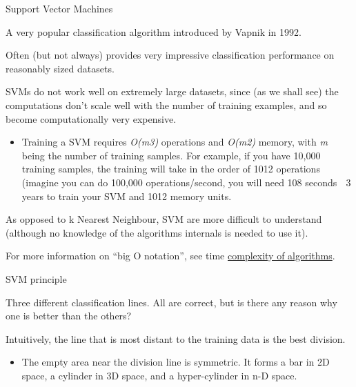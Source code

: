 \documentclass[compress]{beamer}
\providecommand{\tightlist}{%
  \setlength{\itemsep}{0pt}\setlength{\parskip}{0pt}}
\begin{document}
\begin{frame}{Support Vector Machines}

A very popular classification algorithm introduced by Vapnik in 1992.

Often (but not always) provides very impressive classification
performance on reasonably sized datasets.

SVMs do not work well on extremely large datasets, since (as we shall
see) the computations don't scale well with the number of training
examples, and so become computationally very expensive.

\begin{itemize}
\tightlist
\item
  Training a SVM requires \emph{O(m3)} operations and \emph{O(m2)}
  memory, with \emph{m} being the number of training samples\emph{.} For
  example, if you have 10,000 training samples, the training will take
  in the order of 1012 operations (imagine you can do 100,000
  operations/second, you will need 108 seconds  3 years to train your
  SVM and 1012 memory units.
\end{itemize}

As opposed to k Nearest Neighbour, SVM are more difficult to understand
(although no knowledge of the algorithms internals is needed to use it).

For more information on ``big O notation'', see time
\href{https://en.wikipedia.org/wiki/Time_complexity}{complexity of
algorithms}.

\end{frame}

\begin{frame}{SVM principle}

Three different classification lines. All are correct, but is there any
reason why one is better than the others?

Intuitively, the line that is most distant to the training data is the
best division.

\begin{itemize}
\tightlist
\item
  The empty area near the division line is symmetric. It forms a bar in
  2D space, a cylinder in 3D space, and a hyper-cylinder in n-D space.
\end{itemize}

\end{frame}
\end{document}
